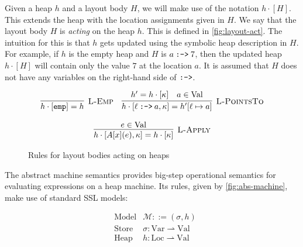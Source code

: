 

Given a heap $h$ and a layout body $H$, we will make use of the
notation $h \cdot [H]$. This extends the heap with the location
assignments given in $H$. We say that the layout body $H$ is
\textit{acting} on the heap $h$. This is defined in
\autoref{fig:layout-act}. The intuition for this is that $h$ gets
updated using the symbolic heap description in $H$. For example, if
$h$ is the empty heap and $H$ is $a \mathbin{\texttt{:->}} 7$, then the updated
heap $h \cdot [H]$ will contain only the value $7$ at the location
$a$. It is assumed that $H$ does not have any variables on the
right-hand side of $\mathbin{\texttt{:->}}$.

\begin{figure}
\[
\begin{array}{c}
  \labinfer[L-Emp]{h \cdot [\emp] = h}
    {}
  ~~~
  \labinfer[L-PointsTo]{h \cdot [\ell \pointsto a, \kappa] = h'[\ell \mapsto a]}
    {h' = h \cdot [\kappa] & a \in \Val}
  \\\\
  \labinfer[L-Apply]{h \cdot [A[x](e), \kappa] = h \cdot [\kappa]}
    {e \in \Val}
\end{array}
\]
  \caption{Rules for layout bodies acting on heaps}
  \label{fig:layout-act}
\end{figure}


The abstract machine semantics provides big-step operational semantics
for evaluating \tool expressions on a heap machine. Its rules, given by
\autoref{fig:abs-machine}, make use of standard SSL models:

\begin{align*}
  &\text{Model} &\mathcal{M} ::= (\sigma, h)\\
  &\text{Store} &\sigma : \text{Var} \rightharpoonup \text{Val}\\
  &\text{Heap} &h : \text{Loc} \rightharpoonup \text{Val}\\
\end{align*}

